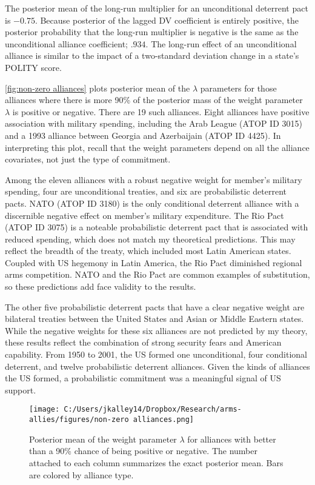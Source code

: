 \documentclass[12pt]{article}
\begin{document}
The posterior mean of the long-run multiplier for an unconditional deterrent pact is $-0.75$. Because posterior of the lagged DV coefficient is entirely positive, the posterior probability that the long-run multiplier is negative is the same as the unconditional alliance coefficient; $.934$. The long-run effect of an unconditional alliance is similar to the impact of a two-standard deviation change in a state's POLITY score.

\autoref{fig:non-zero alliances} plots posterior mean of the $\lambda$ parameters for those alliances where there is more 90\% of the posterior mass of the weight parameter $\lambda$ is positive or negative. There are 19 such alliances. Eight alliances have positive association with military spending, including the Arab League (ATOP ID 3015) and a 1993 alliance between Georgia and Azerbaijain (ATOP ID 4425). In interpreting this plot, recall that the weight parameters depend on all the alliance covariates, not just the type of commitment. 

Among the eleven alliances with a robust negative weight for member's military spending, four are unconditional treaties, and six are probabilistic deterrent pacts. NATO (ATOP ID 3180) is the only conditional deterrent alliance with a discernible negative effect on member's military expenditure.  The Rio Pact (ATOP ID 3075) is a noteable probabilistic deterrent pact that is associated with reduced spending, which does not match my theoretical predictions. This may reflect the breadth of the treaty, which included most Latin American states. Coupled with US hegemony in Latin America, the Rio Pact diminished regional arms competition. NATO and the Rio Pact are common examples of substitution, so these predictions add face validity to the results. 

The other five probabilistic deterrent pacts that have a clear negative weight are bilateral treaties between the United States and Asian or Middle Eastern states. While the negative weights for these six alliances are not predicted by my theory, these results reflect the combination of strong security fears and American capability. From 1950 to 2001, the US formed one unconditional, four conditional deterrent, and twelve probabilistic deterrent alliances. Given the kinds of alliances the US formed, a probabilistic commitment was a meaningful signal of US support. 

\begin{figure}[htbp]
	\centering
		\texttt{[image: C:/Users/jkalley14/Dropbox/Research/arms-allies/figures/non-zero alliances.png]}
	\caption{Posterior mean of the weight parameter $\lambda$ for alliances with better than a 90\% chance of being positive or negative. The number attached to each column summarizes the exact posterior mean. Bars are colored by alliance type.}
	\label{fig:non-zero alliances}
\end{figure}
\end{document}
